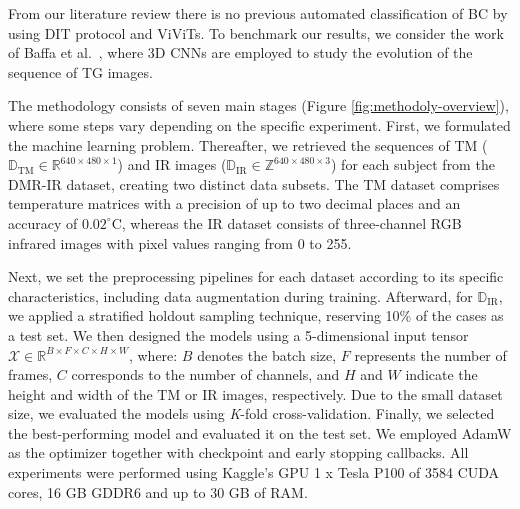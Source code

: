 \documentclass[runningheads]{llncs}
\begin{document}
From our literature review there is no previous automated
classification of \ac{BC} by using \ac{DIT} protocol and \ac{ViViTs}. To
benchmark our results, we consider the work of Baffa et al.~\cite{DeMatheus2023},
where 3D \ac{CNNs} are employed to study the evolution of the sequence
of \ac{TG} images.

The methodology consists of seven main stages (Figure
\ref{fig:methodoly-overview}), where some steps vary depending on the
specific experiment. First, we formulated the machine learning
problem. Thereafter, we retrieved the sequences of \ac{TM}
($\mathbb{D}_{\mathrm{TM}} \in \mathbb{R}^{640 \times 480 \times 1}$) and
\ac{IR} images
($\mathbb{D}_{\mathrm{IR}} \in \mathbb{Z}^{640 \times 480 \times 3}$) for each
subject from the DMR-IR dataset, creating two distinct data
subsets. The \ac{TM} dataset comprises temperature matrices with a
precision of up to two decimal places and an accuracy of
\(0.02^\circ \text{C}\), whereas the \ac{IR} dataset consists of
three-channel RGB infrared images with pixel values ranging from 0 to
255.

Next, we set the preprocessing pipelines for each dataset
according to its specific characteristics, including data augmentation
during training. Afterward, for $\mathbb{D}_{\mathrm{IR}}$, we applied a
stratified holdout sampling technique, reserving 10\% of the cases as
a test set.  We then designed the models using a 5-dimensional input
tensor
$\mathcal{X} \in \mathbb{R}^{B \times F \times C \times H \times W}$,
where: $B$ denotes the batch size, $F$ represents the number of
frames, $C$ corresponds to the number of channels, and $H$ and $W$
indicate the height and width of the \ac{TM} or \ac{IR} images,
respectively. Due to the small dataset size, we evaluated the models
using \textit{K}-fold cross-validation. Finally, we selected the
best-performing model and evaluated it on the test set. We employed
AdamW as the optimizer together with checkpoint and early stopping
callbacks. All experiments were performed using Kaggle's GPU 1 x Tesla
P100 of 3584 CUDA cores, 16 GB GDDR6 and up to 30 GB of RAM.

\end{document}
